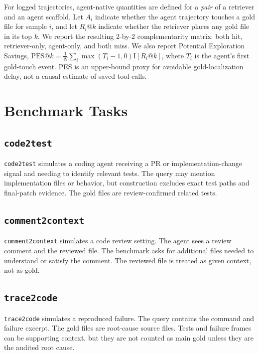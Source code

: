 \documentclass[11pt]{article}
\newcommand{\code}[1]{\texttt{#1}}
\begin{document}
For logged trajectories, agent-native quantities are defined for a \emph{pair} of a retriever and an agent scaffold. Let \(A_i\) indicate whether the agent trajectory touches a gold file for sample \(i\), and let \(R_i@k\) indicate whether the retriever places any gold file in its top \(k\). We report the resulting 2-by-2 complementarity matrix: both hit, retriever-only, agent-only, and both miss. We also report Potential Exploration Savings, \(\mathrm{PES}@k = \frac{1}{N}\sum_i \max(T_i-1,0)\mathrm{I}[R_i@k]\), where \(T_i\) is the agent's first gold-touch event. PES is an upper-bound proxy for avoidable gold-localization delay, not a causal estimate of saved tool calls.

\section{Benchmark Tasks}

\subsection{\code{code2test}}

\code{code2test} simulates a coding agent receiving a PR or implementation-change signal and needing to identify relevant tests. The query may mention implementation files or behavior, but construction excludes exact test paths and final-patch evidence. The gold files are review-confirmed related tests.

\subsection{\code{comment2context}}

\code{comment2context} simulates a code review setting. The agent sees a review comment and the reviewed file. The benchmark asks for additional files needed to understand or satisfy the comment. The reviewed file is treated as given context, not as gold.

\subsection{\code{trace2code}}

\code{trace2code} simulates a reproduced failure. The query contains the command and failure excerpt. The gold files are root-cause source files. Tests and failure frames can be supporting context, but they are not counted as main gold unless they are the audited root cause.
\end{document}
